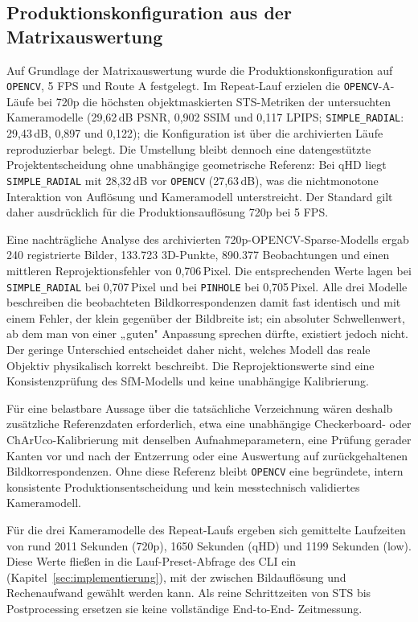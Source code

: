 \subsection{Produktionskonfiguration aus der Matrixauswertung}
\label{sec:produktionskonfiguration}

Auf Grundlage der Matrixauswertung wurde die Produktionskonfiguration auf
\texttt{OPENCV}, 5 FPS und Route A festgelegt. Im Repeat-Lauf erzielen die
\texttt{OPENCV}-A-Läufe bei 720p die höchsten objektmaskierten STS-Metriken
der untersuchten Kameramodelle (29,62\,dB PSNR, 0,902 SSIM und 0,117 LPIPS;
\texttt{SIMPLE\_RADIAL}: 29,43\,dB, 0,897 und 0,122); die
Konfiguration ist über die archivierten Läufe reproduzierbar belegt. Die
Umstellung bleibt dennoch eine datengestützte Projektentscheidung ohne
unabhängige geometrische Referenz: Bei qHD liegt \texttt{SIMPLE\_RADIAL} mit
28,32\,dB vor \texttt{OPENCV} (27,63\,dB), was die nichtmonotone Interaktion
von Auflösung und Kameramodell unterstreicht. Der Standard gilt daher
ausdrücklich für die Produktionsauflösung 720p bei 5 FPS.

Eine nachträgliche Analyse des archivierten 720p-OPENCV-Sparse-Modells ergab
240 registrierte Bilder, 133.723 3D-Punkte, 890.377 Beobachtungen und einen
mittleren Reprojektionsfehler von 0,706\,Pixel. Die entsprechenden Werte lagen
bei \texttt{SIMPLE\_RADIAL} bei 0,707\,Pixel und bei \texttt{PINHOLE} bei
0,705\,Pixel. Alle drei Modelle beschreiben die beobachteten
Bildkorrespondenzen damit fast identisch und mit einem Fehler, der klein
gegenüber der Bildbreite ist; ein absoluter Schwellenwert, ab dem man von
einer „guten" Anpassung sprechen dürfte, existiert jedoch nicht. Der geringe
Unterschied entscheidet daher nicht, welches Modell das reale Objektiv
physikalisch korrekt beschreibt.
Die Reprojektionswerte sind eine Konsistenzprüfung des SfM-Modells und keine
unabhängige Kalibrierung.

Für eine belastbare Aussage über die tatsächliche Verzeichnung wären deshalb
zusätzliche Referenzdaten erforderlich, etwa eine unabhängige
Checkerboard- oder ChArUco-Kalibrierung mit denselben Aufnahmeparametern,
eine Prüfung gerader Kanten vor und nach der Entzerrung oder eine Auswertung
auf zurückgehaltenen Bildkorrespondenzen. Ohne diese Referenz bleibt
\texttt{OPENCV} eine begründete, intern konsistente Produktionsentscheidung
und kein messtechnisch validiertes Kameramodell.

Für die drei Kameramodelle des Repeat-Laufs ergeben sich gemittelte Laufzeiten
von rund 2011 Sekunden (720p), 1650 Sekunden (qHD) und 1199 Sekunden (low).
Diese Werte fließen in die Lauf-Preset-Abfrage
des CLI ein (Kapitel~\ref{sec:implementierung}), mit der zwischen
Bildauflösung und Rechenaufwand gewählt werden kann. Als reine Schrittzeiten
von STS bis Postprocessing ersetzen sie keine vollständige End-to-End-
Zeitmessung.


